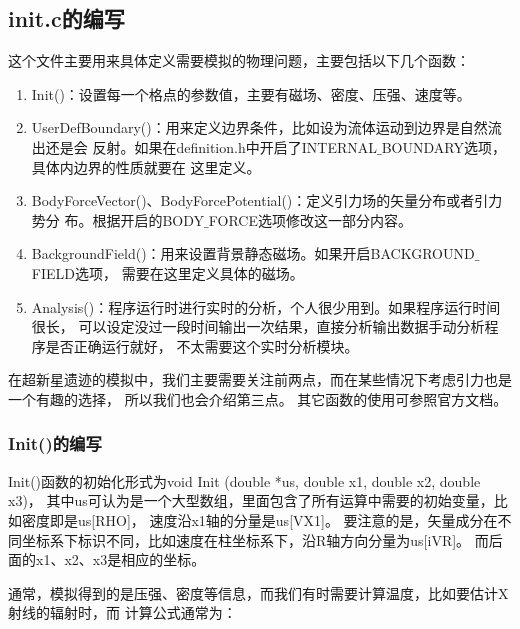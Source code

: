 \subsection{init.c的编写}
这个文件主要用来具体定义需要模拟的物理问题，主要包括以下几个函数：

\begin{enumerate}

    \item Init()：设置每一个格点的参数值，主要有磁场、密度、压强、速度等。

    \item UserDefBoundary()：用来定义边界条件，比如设为流体运动到边界是自然流出还是会
    反射。如果在definition.h中开启了INTERNAL$\_$BOUNDARY选项，具体内边界的性质就要在
    这里定义。

    \item BodyForceVector()、BodyForcePotential()：定义引力场的矢量分布或者引力势分
    布。根据开启的BODY$\_$FORCE选项修改这一部分内容。

    \item BackgroundField()：用来设置背景静态磁场。如果开启BACKGROUND$\_$FIELD选项，
    需要在这里定义具体的磁场。

    \item Analysis()：程序运行时进行实时的分析，个人很少用到。如果程序运行时间很长，
    可以设定没过一段时间输出一次结果，直接分析输出数据手动分析程序是否正确运行就好，
    不太需要这个实时分析模块。

\end{enumerate}
在超新星遗迹的模拟中，我们主要需要关注前两点，而在某些情况下考虑引力也是一个有趣的选择，
所以我们也会介绍第三点。
其它函数的使用可参照官方文档。

\subsubsection{Init()的编写}
Init()函数的初始化形式为void Init (double *us, double x1, double x2, double x3)，
其中us可认为是一个大型数组，里面包含了所有运算中需要的初始变量，比如密度即是us[RHO]，
速度沿x1轴的分量是us[VX1]。
要注意的是，矢量成分在不同坐标系下标识不同，比如速度在柱坐标系下，沿R轴方向分量为us[iVR]。
而后面的x1、x2、x3是相应的坐标。

通常，模拟得到的是压强、密度等信息，而我们有时需要计算温度，比如要估计X射线的辐射时，而
计算公式通常为：

